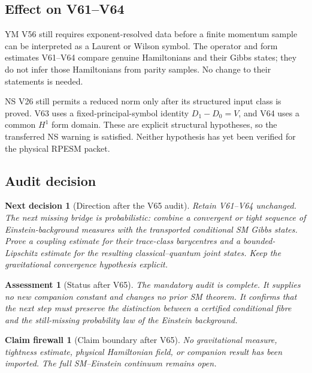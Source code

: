 \documentclass[11pt]{article}
\newtheorem{firewall}[theorem]{Claim firewall}
\newtheorem{decision}[theorem]{Next decision}
\newtheorem{assessment}[theorem]{Assessment}
\theoremstyle{remark}
\begin{document}
\subsection{Effect on V61--V64}

YM V56 still requires exponent-resolved data before a finite
momentum sample can be interpreted as a Laurent or Wilson symbol.
The operator and form estimates V61--V64 compare genuine
Hamiltonians and their Gibbs states; they do not infer those
Hamiltonians from parity samples.  No change to their statements is
needed.

NS V26 still permits a reduced norm only after its structured input
class is proved.  V63 uses a fixed-principal-symbol identity
\(D_1-D_0=V\), and V64 uses a common \(H^1\) form domain.  These are
explicit structural hypotheses, so the transferred NS warning is
satisfied.  Neither hypothesis has yet been verified for the
physical RPESM packet.

\subsection{Audit decision}

\begin{decision}[Direction after the V65 audit]
\label{dec:v12v65-direction}
Retain V61--V64 unchanged.  The next missing bridge is probabilistic:
combine a convergent or tight sequence of Einstein-background
measures with the transported conditional SM Gibbs states.  Prove a
coupling estimate for their trace-class barycentres and a
bounded-Lipschitz estimate for the resulting classical--quantum
joint states.  Keep the gravitational convergence hypothesis
explicit.
\end{decision}

\begin{assessment}[Status after V65]
\label{ass:v12v65-status}
The mandatory audit is complete.  It supplies no new companion
constant and changes no prior SM theorem.  It confirms that the next
step must preserve the distinction between a certified conditional
fibre and the still-missing probability law of the Einstein
background.
\end{assessment}

\begin{firewall}[Claim boundary after V65]
\label{fire:v12v65-claim}
No gravitational measure, tightness estimate, physical Hamiltonian
field, or companion result has been imported.  The full
SM--Einstein continuum remains open.
\end{firewall}
\end{document}
